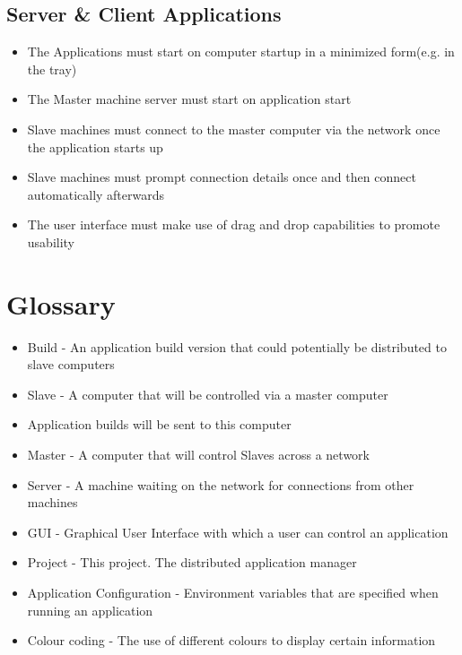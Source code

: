\documentclass[a4paper,12pt,final]{article}
\begin{document}
\subsection{Server \& Client Applications}
\begin{itemize}
\item The Applications must start on computer startup in a minimized form(e.g. in the tray)
\item The Master machine server must start on application start
\item Slave machines must connect to the master computer via the network once the application starts up
\item Slave machines must prompt connection details once and then connect automatically afterwards
\item The user interface must make use of drag and drop capabilities to promote usability
\end{itemize}

\section{Glossary}
\begin{itemize}
\item Build - An application build version that could potentially be distributed to slave computers
\item Slave - A computer that will be controlled via a master computer
\item Application builds will be sent to this computer
\item Master - A computer that will control Slaves across a network
\item Server - A machine waiting on the network for connections from other machines
\item GUI - Graphical User Interface with which a user can control an application
\item Project - This project. The distributed application manager
\item Application Configuration - Environment variables that are specified when running an application
\item Colour coding - The use of different colours to display certain information
\end{itemize}
\end{document}
